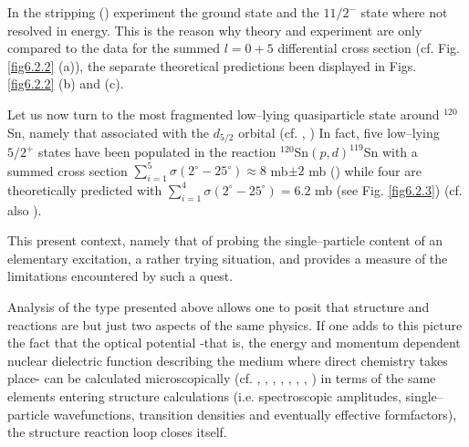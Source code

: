 \documentclass[a4paper,11pt]{book}
\numberwithin{equation}{section}
\numberwithin{figure}{section}
\numberwithin{table}{section}
\begin{document}
In the stripping (\cite{Bechara:75}) experiment the 	ground state and the $11/2^-$ state where not resolved in energy. This is the reason why theory and experiment are only compared to the data for the summed $l=0+5$ differential cross section (cf. Fig. \ref{fig6.2.2} (a)), the separate theoretical predictions been displayed in Figs. \ref{fig6.2.2} (b) and (c).


Let us now turn to the most fragmented low--lying quasiparticle state around $^{120}$Sn, namely that associated with the $d_{5/2}$ orbital 	(cf. \cite{Idini:13}, \cite{Idini:12}) In fact, five low--lying $5/2^+$ states have been populated in the 	reaction  $^{120}$Sn$(p,d)^{119}$Sn with a summed cross section $\sum_{i=1}^5 \sigma(2^\circ-25^\circ)\approx 8$ mb$\pm 2$ mb (\cite{Dickey:82}) while four are theoretically predicted with $\sum_{i=1}^4\sigma(2^\circ-25^\circ)= 6.2$ mb (see Fig. \ref{fig6.2.3}) (cf. also \cite{Idini:14}).


This present context, namely that of probing the single--particle 	content of an elementary excitation, a rather trying situation, and provides a measure of the limitations encountered by such a quest.


Analysis of the type presented above allows one to posit that structure and reactions are but just two aspects of the same physics. If one adds to this picture the fact that the optical potential -that is, the energy and momentum dependent nuclear dielectric function describing the medium 	where direct chemistry takes place- can be calculated microscopically (cf. \cite{Mahaux:85}, \cite{Broglia:71}, \cite{Fernandez:10}, \cite{Fernandez:10b}, \cite{Broglia:81b}, \cite{Pollarolo:83}, \cite{Dickhoff:05}, \cite{Jenning:11} ) in terms of the same elements entering structure calculations (i.e. spectroscopic amplitudes, single--particle wavefunctions, transition densities and eventually effective formfactors), the structure reaction loop closes itself.
\end{document}
